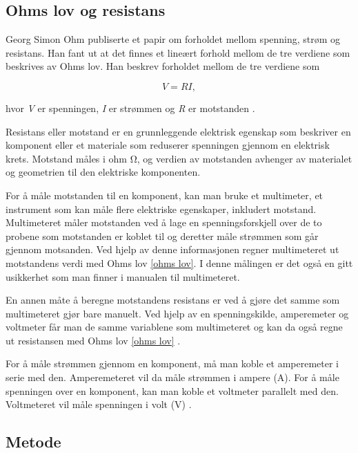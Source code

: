 \documentclass[twocolumn, a4paper, 11pt]{article} %
\begin{document}
\subsection{Ohms lov og resistans}
Georg Simon Ohm publiserte et papir om forholdet mellom spenning, strøm og resistans. Han fant ut at det finnes et lineært forhold mellom de tre verdiene som beskrives av Ohms lov. Han beskrev forholdet mellom de tre verdiene som

\begin{equation}
     V = R I ,
    \label{ohms lov}
\end{equation}

hvor \textit{V} er spenningen, \textit{I} er strømmen og \textit{R} er motstanden \cite{Ohms_lov}.

\bigskip 


Resistans eller motstand er en grunnleggende elektrisk egenskap som beskriver en komponent eller et materiale som reduserer spenningen gjennom en elektrisk krets. Motstand måles i ohm \textit{$\si{\ohm}$}, og verdien av motstanden avhenger av materialet og geometrien til den elektriske komponenten.

For å måle motstanden til en komponent, kan man bruke et multimeter, et instrument som kan måle flere elektriske egenskaper, inkludert motstand. Multimeteret måler motstanden ved å lage en spenningsforskjell over de to probene som motstanden er koblet til og deretter måle strømmen som går gjennom motsanden. Ved hjelp av denne informasjonen regner multimeteret ut motstandens verdi med Ohms lov \eqref{ohms lov}. I denne målingen er det også en gitt usikkerhet som man finner i manualen til multimeteret. 

En annen måte å beregne motstandens resistans er ved å gjøre det samme som multimeteret gjør bare manuelt. Ved hjelp av en spenningskilde, amperemeter og voltmeter får man de samme variablene som multimeteret og kan da også regne ut resistansen med Ohms lov \eqref{ohms lov} \cite{Elektrisk_strøm}.

For å måle strømmen gjennom en komponent, må man koble et amperemeter i serie med den. Amperemeteret vil da måle strømmen i ampere (A). For å måle spenningen over en komponent, kan man koble et voltmeter parallelt med den. Voltmeteret vil måle spenningen i volt (V) \cite{oppgavetekst}.


\subsection{Metode}
\end{document}
